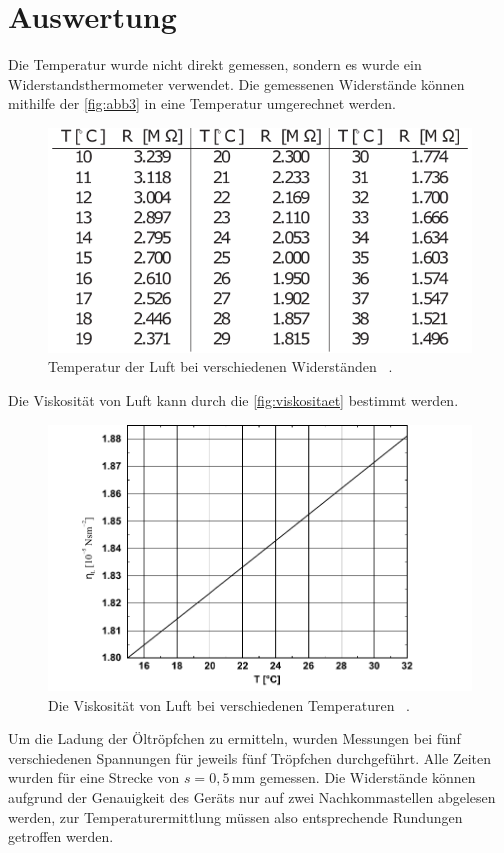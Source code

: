 \section{Auswertung}

Die Temperatur wurde nicht direkt gemessen, sondern es wurde ein Widerstandsthermometer verwendet.
Die gemessenen Widerstände können mithilfe der \autoref{fig:abb3} in eine Temperatur umgerechnet werden.
\begin{figure}[H]
  \centering
  \includegraphics{figures/Temperatur.pdf}
  \caption{Temperatur der Luft bei verschiedenen Widerständen \cite{ap12}\, .} 
  \label{fig:abb3}
\end{figure}
Die Viskosität von Luft kann durch die \autoref{fig:viskositaet} bestimmt werden.
\begin{figure}[H]
  \centering
  \includegraphics{figures/Viskositaet.pdf}
  \caption{Die Viskosität von Luft bei verschiedenen Temperaturen  \cite{ap12}\, .} 
  \label{fig:viskositaet}
\end{figure}


Um die Ladung der Öltröpfchen zu ermitteln, wurden Messungen bei fünf verschiedenen Spannungen für jeweils fünf Tröpfchen durchgeführt.
Alle Zeiten wurden für eine Strecke von $s = 0,5 \, \unit{\milli\meter}$ gemessen.
Die Widerstände können aufgrund der Genauigkeit des Geräts nur auf zwei Nachkommastellen abgelesen werden, zur Temperaturermittlung
müssen also entsprechende Rundungen getroffen werden. \\

